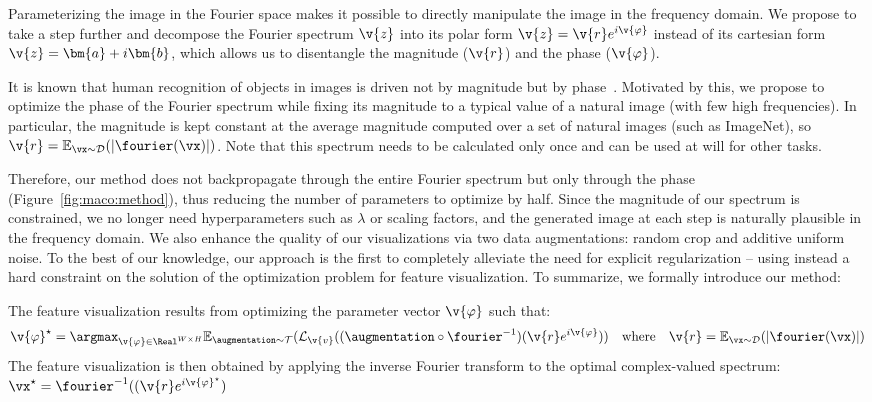 Parameterizing the image in the Fourier space makes it possible to directly manipulate the image in the frequency domain. We propose to take a step further and decompose the Fourier spectrum $\v{z}$ into its polar form $\v{z} = \v{r} e^{i \v{\varphi}}$ instead of its cartesian form $\v{z} = \bm{a} + i \bm{b}$, which allows us to disentangle the magnitude ($\v{r}$) and the phase ($\v{\varphi}$).

It is known that human recognition of objects in images is driven not by magnitude but by phase~\cite{oppenheim1981importance,caelli1982visual,guyader2004image,joubert2009rapid, gladilin2015role}. Motivated by this, we propose to optimize the phase of the Fourier spectrum while fixing its magnitude to a typical value of a natural image (with few high frequencies). In particular, the magnitude is kept constant at the average magnitude computed over a set of natural images (such as ImageNet), so $\v{r} = \mathbb{E}_{\vx \sim \mathcal{D}}(|\fourier(\vx)|)$. Note that this spectrum needs to be calculated only once and can be used at will for other tasks.

\begin{figure}[ht]

\end{figure}


Therefore, our method does not backpropagate through the entire Fourier spectrum but only through the phase (Figure~\ref{fig:maco:method}), thus reducing the number of parameters to optimize by half. Since the magnitude of our spectrum is constrained, we no longer need hyperparameters such as $\lambda$ or scaling factors, and the generated image at each step is naturally plausible in the frequency domain.
We also enhance the quality of our visualizations via two data augmentations: random crop and additive uniform noise.
To the best of our knowledge, our approach is the first to completely alleviate the need for explicit regularization -- using instead a hard constraint on the solution of the optimization problem for feature visualization.
To summarize, we formally introduce our method:

\begin{definition}[\textbf{\magfv}]
The feature visualization results from optimizing the parameter vector $\v{\varphi}$  such that:
$$
\v{\varphi}^\star = \argmax_{\v{\varphi} \in \Real^{W \times H}}
\mathbb{E}_{\augmentation \sim \mathcal{T}}(\mathcal{L}_{\v{v}}((\augmentation \circ \fourier^{-1})(\v{r} e^{i \v{\varphi}})) ~~~\text{where}~~~ \v{r} = \mathbb{E}_{\vx \sim \mathcal{D}}(|\fourier(\vx)|)
$$
The feature visualization is then obtained by applying the inverse Fourier transform to the optimal complex-valued spectrum: $\vx^\star = \fourier^{-1}((\v{r} e^{i \v{\varphi}^\star})$
\end{definition}









